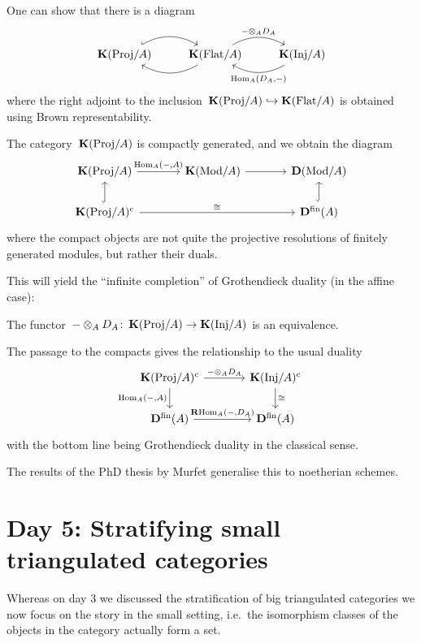 \documentclass[10pt,a4paper]{article}
\begin{document}
One can show that there is a diagram
\begin{equation}
  \begin{tikzcd}
    \KKK(\mathrm{Proj}/A) \arrow[bend left, hook]{r} & \KKK(\Flat/A) \arrow[bend left]{l} \arrow[bend left]{r}{-\otimes_A D_A} & \KKK(\Inj/A) \arrow[bend left]{l}{\Hom_A(D_A,-)}
  \end{tikzcd}
\end{equation}
where the right adjoint to the inclusion~$\operatorname{\mathbf{K}}(\mathrm{Proj}/A)\hookrightarrow\operatorname{\mathbf{K}}(\mathrm{Flat}/A)$ is obtained using Brown representability.
\begin{proposition}
  The category~$\operatorname{\mathbf{K}}(\mathrm{Proj}/A)$ is compactly generated, and we obtain the diagram
  \begin{equation}
    \begin{tikzcd}[column sep = large]
      \KKK(\mathrm{Proj}/A) \arrow{r}{\Hom_A(-,A)} & \KKK(\Mod/A) \arrow{r} & \derived(\Mod/A) \\
      \KKK(\mathrm{Proj}/A)^\cc \arrow[hook]{u} \arrow{rr}{\cong} & & \derived^\fin(A) \arrow[hook]{u}
    \end{tikzcd}
  \end{equation}
  where the compact objects are not quite the projective resolutions of finitely generated modules, but rather their duals.
\end{proposition}
This will yield the ``infinite completion'' of Grothendieck duality (in the affine case):
\begin{theorem}
  The functor~$-\otimes_AD_A\colon\operatorname{\mathbf{K}}(\mathrm{Proj}/A)\to\operatorname{\mathbf{K}}(\mathrm{Inj}/A)$ is an equivalence.
\end{theorem}
The passage to the compacts gives the relationship to the usual duality
\begin{equation}
  \begin{tikzcd}[column sep = large]
    \KKK(\mathrm{Proj}/A)^\cc \arrow{r}{-\otimes_AD_A} \arrow{d}[swap]{\Hom_A(-,A)} & \KKK(\Inj/A)^\cc \arrow{d}{\cong} \\
    \derived^\fin(A) \arrow{r}{\RRRHom_A(-,D_A)} & \derived^\fin(A)
  \end{tikzcd}
\end{equation}
with the bottom line being Grothendieck duality in the classical sense.

\begin{remark}
  The results of the PhD thesis by Murfet generalise this to noetherian schemes.
\end{remark}


\section{Day 5: Stratifying small triangulated categories}
Whereas on day 3 we discussed the stratification of big triangulated categories we now focus on the story in the small setting, i.e.\ the isomorphism classes of the objects in the category actually form a set.
\end{document}
